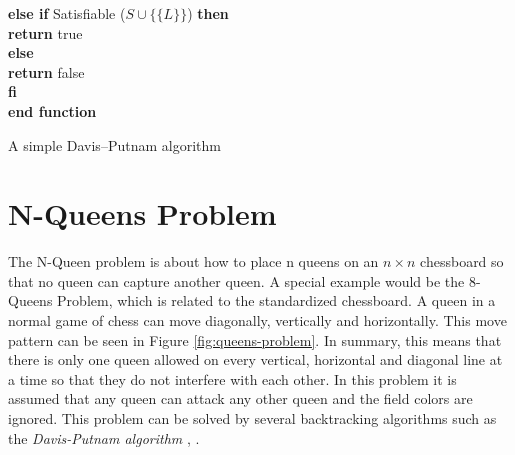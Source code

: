\begin{listing}[h!]
    \hspace*{0.5cm} \textbf{else if} Satisfiable ($S \cup \{\{L\}\}$) \textbf{then}\\
      \hspace*{1.0cm} \textbf{return} true\\
    \hspace*{0.5cm} \textbf{else}\\
      \hspace*{1.0cm} \textbf{return} false\\
    \hspace*{0.5cm} \textbf{fi}\\
  \textbf{end function}
  \caption{A simple Davis–Putnam algorithm \cite{Zhang2000}}
  \label{code:recursiveDavisPutnam}
\end{listing}

\section{N-Queens Problem}
\label{sec:sciQueens}
The N-Queen problem is about how to place n queens on an $n \times n$ chessboard so that no queen can capture another queen. A special example would be the 8-Queens Problem, which is related to the standardized chessboard. A queen in a normal game of chess can move diagonally, vertically and horizontally. This move pattern can be seen in Figure \ref{fig:queens-problem}. In summary, this means that there is only one queen allowed on every vertical, horizontal and diagonal line at a time so that they do not interfere with each other. In this problem it is assumed that any queen can attack any other queen and the field colors are ignored. This problem can be solved by several backtracking algorithms such as the \textit{Davis-Putnam algorithm} \cite{OMCA2019}, \cite{GeeksGeeks2019} \cite{Stroetman2019}.

